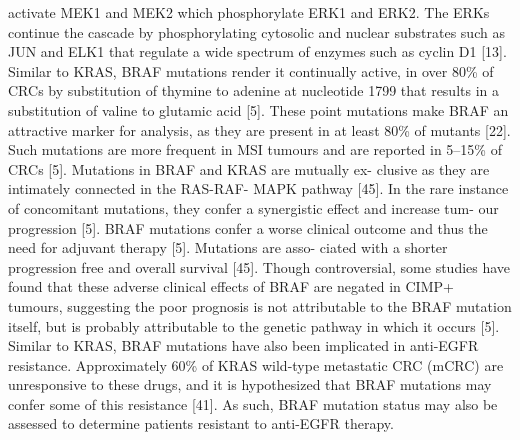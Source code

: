     activate MEK1 and MEK2 which phosphorylate ERK1 and ERK2. The ERKs continue the
    cascade by phosphorylating cytosolic and nuclear substrates such as JUN and ELK1
    that regulate a wide spectrum of enzymes such as cyclin D1 [13]. Similar to
    KRAS, BRAF mutations render it continually active, in over 80\% of CRCs by
    substitution of thymine to adenine at nucleotide 1799 that results in a
    substitution of valine to glutamic acid [5]. These point mutations make BRAF an
    attractive marker for analysis, as they are present in at least 80\% of mutants
    [22]. Such mutations are more frequent in MSI tumours and are reported in 5–15\%
    of CRCs [5]. Mutations in BRAF and KRAS are mutually ex- clusive as they are
    intimately connected in the RAS-RAF- MAPK pathway [45]. In the rare instance of
    concomitant mutations, they confer a synergistic effect and increase tum- our
    progression [5]. BRAF mutations confer a worse clinical outcome and thus the
    need for adjuvant therapy [5]. Mutations are asso- ciated with a shorter
    progression free and overall survival [45]. Though controversial, some studies
    have found that these adverse clinical effects of BRAF are negated in CIMP+
    tumours, suggesting the poor prognosis is not attributable to the BRAF mutation
    itself, but is probably attributable to the genetic pathway in which it occurs
    [5]. Similar to KRAS, BRAF mutations have also been implicated in anti-EGFR
    resistance. Approximately 60\% of KRAS wild-type metastatic CRC (mCRC) are
    unresponsive to these drugs, and it is hypothesized that BRAF mutations may
    confer some of this resistance [41]. As such, BRAF mutation status may also be
    assessed to determine patients resistant to anti-EGFR therapy.


